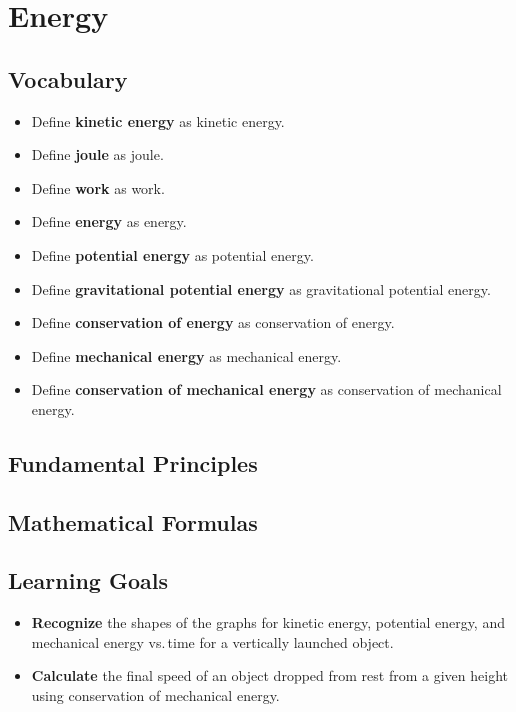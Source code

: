 \documentclass[dvipsnames]{article}
\begin{document}
\section{Energy}

\subsection*{Vocabulary}

\vspace{-6pt}

\begin{itemize}[itemsep=0pt]
    \item Define \textbf{\gls{kinetic energy}} as \glsdesc{kinetic energy}.
    \item Define \textbf{\gls{joule}} as \glsdesc{joule}.
    \item Define \textbf{\gls{work}} as \glsdesc{work}.
    \item Define \textbf{\gls{energy}} as \glsdesc{energy}.
    \item Define \textbf{\gls{potential energy}} as \glsdesc{potential energy}.
    \item Define \textbf{\gls{gravitational potential energy}} as \glsdesc{gravitational potential energy}.
    \item Define \textbf{\gls{conservation of energy}} as \glsdesc{conservation of energy}.
    \item Define \textbf{\gls{mechanical energy}} as \glsdesc{mechanical energy}.
    \item Define \textbf{\gls{conservation of mechanical energy}} as \glsdesc{conservation of mechanical energy}.
\end{itemize}

\subsection*{Fundamental Principles}

\subsection*{Mathematical Formulas}

\subsection*{Learning Goals}

\begin{itemize}[itemsep=0pt]
    \item \textbf{Recognize} the shapes of the graphs for kinetic energy, potential energy, and mechanical energy vs.\,time for a vertically launched object. 
    \item \textbf{Calculate} the final speed of an object dropped from rest from a given height using conservation of mechanical energy.
\end{itemize}
\end{document}
